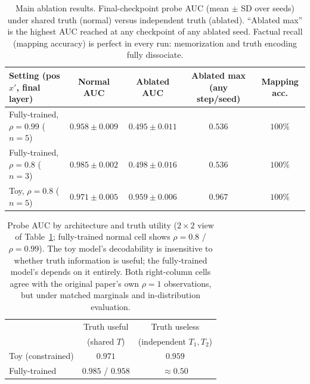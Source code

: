 
\begin{table}[t]
  \centering
  \small
  \begin{tabular}{lcccc}
    \toprule
    Setting (pos $x'$, final layer) & Normal AUC & Ablated AUC &
      Ablated max (any step/seed) & Mapping acc. \\
    \midrule
    Fully-trained, $\rho=0.99$ ($n{=}5$) & $0.958 \pm 0.009$ &
      $0.495 \pm 0.011$ & $0.536$ & $100\%$ \\
    Fully-trained, $\rho=0.8$ ($n{=}3$) & $0.985 \pm 0.002$ &
      $0.498 \pm 0.016$ & $0.536$ & $100\%$ \\
    Toy, $\rho=0.8$ ($n{=}5$) & $0.971 \pm 0.005$ &
      $0.959 \pm 0.006$ & $0.967$ & $100\%$ \\
    \bottomrule
  \end{tabular}
  \caption{Main ablation results. Final-checkpoint probe AUC
  (mean $\pm$ SD over seeds) under shared truth (normal) versus
  independent truth (ablated). ``Ablated max'' is the highest AUC
  reached at any checkpoint of any ablated seed. Factual recall
  (mapping accuracy) is perfect in every run: memorization and truth
  encoding fully dissociate.}
  \label{tab:ablation}
\end{table}

\begin{table}[t]
  \centering
  \small
  \begin{tabular}{lcc}
    \toprule
    & Truth useful & Truth useless \\
    & (shared $T$) & (independent $T_1, T_2$) \\
    \midrule
    Toy (constrained) & $0.971$ & $0.959$ \\
    Fully-trained & $0.985$ / $0.958$ & $\approx 0.50$ \\
    \bottomrule
  \end{tabular}
  \caption{Probe AUC by architecture and truth utility
  ($2\times 2$ view of Table~\ref{tab:ablation}; fully-trained normal
  cell shows $\rho=0.8$ / $\rho=0.99$). The toy model's decodability is
  insensitive to whether truth information is useful; the fully-trained
  model's depends on it entirely. Both right-column cells agree with
  the original paper's own $\rho=1$ observations, but under matched
  marginals and in-distribution evaluation.}
  \label{tab:two-by-two}
\end{table}



